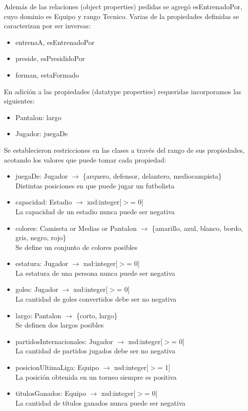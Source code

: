 \documentclass{article}
\begin{document}
Además de las relaciones (object properties) pedidas se agregó esEntrenadoPor, cuyo dominio es Equipo y rango Tecnico.
Varias de la propiedades definidas se caracterizan por ser inversas:
\begin{itemize}[itemsep=2pt, topsep=0pt]
 \item entrenaA, esEntrenadoPor
 \item preside, esPresididoPor
 \item forman, estaFormado
\end{itemize}

En adición a las propiedades (datatype properties) requeridas incorporamos las siguientes:
\begin{itemize}[itemsep=2pt, topsep=0pt]
 \item Pantalon: largo
 \item Jugador: juegaDe
\end{itemize}

Se establecieron restricciones en las clases a través del rango de sus propiedades, acotando los valores que puede tomar cada propiedad:
\begin{itemize}[itemsep=2pt, topsep=0pt]
 \item juegaDe: Jugador $\rightarrow$ \{arquero, defensor, delantero, mediocampista\}
  \\Distintas posiciones en que puede jugar un futbolista
 \item capacidad: Estadio $\rightarrow$ xsd:integer[$>$= 0]
  \\La capacidad de un estadio nunca puede ser negativa
 \item colores: Camiseta or Medias or Pantalon $\rightarrow$ \{amarillo, azul, blanco, bordo, gris, negro, rojo\}
  \\Se define un conjunto de colores posibles
 \item estatura: Jugador $\rightarrow$ xsd:integer[$>$= 0]
  \\La estatura de una persona nunca puede ser negativa
 \item goles: Jugador $\rightarrow$ xsd:integer[$>$= 0]
  \\La cantidad de goles convertidos debe ser no negativa
 \item largo: Pantalon $\rightarrow$ \{corto, largo\}
  \\Se definen dos largos posibles
 \item partidosInternacionales: Jugador $\rightarrow$ xsd:integer[$>$= 0]
  \\La cantidad de partidos jugados debe ser no negativa
 \item posicionUltimaLiga: Equipo $\rightarrow$ xsd:integer[$>$= 1]
  \\La posición obtenida en un torneo siempre es positiva
 \item titulosGanados: Equipo $\rightarrow$ xsd:integer[$>$= 0]
  \\La cantidad de títulos ganados nunca puede ser negativa
\end{itemize}
\end{document}
